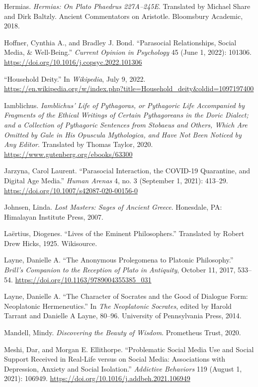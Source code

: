 \documentclass[
]{book}
\begin{document}
Hermias. \emph{Hermias: On Plato Phaedrus 227A--245E}. Translated by Michael Share and Dirk Baltzly. Ancient Commentators on Aristotle. Bloomsbury Academic, 2018.

Hoffner, Cynthia A., and Bradley J. Bond. ``Parasocial Relationships, Social Media, \& Well-Being.'' \emph{Current Opinion in Psychology} 45 (June 1, 2022): 101306. \url{https://doi.org/10.1016/j.copsyc.2022.101306}

``Household Deity.'' In \emph{Wikipedia}, July 9, 2022. \href{https://doi.org/10.1016/j.copsyc.2022.101306}{https://en.wikipedia.org/w/index.php?title=Household\_deity\&oldid=1097197400}

Iamblichus. \emph{Iamblichus' Life of Pythagoras, or Pythagoric Life Accompanied by Fragments of the Ethical Writings of Certain Pythagoreans in the Doric Dialect; and a Collection of Pythagoric Sentences from Stobaeus and Others, Which Are Omitted by Gale in His Opuscula Mythologica, and Have Not Been Noticed by Any Editor}. Translated by Thomas Taylor, 2020. \url{https://www.gutenberg.org/ebooks/63300}

Jarzyna, Carol Laurent. ``Parasocial Interaction, the COVID-19 Quarantine, and Digital Age Media.'' \emph{Human Arenas} 4, no. 3 (September 1, 2021): 413--29. \href{https://www.gutenberg.org/ebooks/63300}{https://doi.org/10.1007/s42087-020-00156-0}

Johnsen, Linda. \emph{Lost Masters: Sages of Ancient Greece}. Honesdale, PA: Himalayan Institute Press, 2007.

Laërtius, Diogenes. ``Lives of the Eminent Philosophers.'' Translated by Robert Drew Hicks, 1925. Wikisource.

Layne, Danielle A. ``The Anonymous Prolegomena to Platonic Philosophy.'' \emph{Brill's Companion to the Reception of Plato in Antiquity}, October 11, 2017, 533--54. \href{https://www.gutenberg.org/ebooks/63300}{https://doi.org/10.1163/9789004355385\_031}

Layne, Danielle A. ``The Character of Socrates and the Good of Dialogue Form: Neoplatonic Hermeneutics.'' In \emph{The Neoplatonic Socrates}, edited by Harold Tarrant and Danielle A Layne, 80--96. University of Pennsylvania Press, 2014.

Mandell, Mindy. \emph{Discovering the Beauty of Wisdom}. Prometheus Trust, 2020.

Meshi, Dar, and Morgan E. Ellithorpe. ``Problematic Social Media Use and Social Support Received in Real-Life versus on Social Media: Associations with Depression, Anxiety and Social Isolation.'' \emph{Addictive Behaviors} 119 (August 1, 2021): 106949. \href{https://www.gutenberg.org/ebooks/63300}{https://doi.org/10.1016/j.addbeh.2021.106949}
\end{document}

